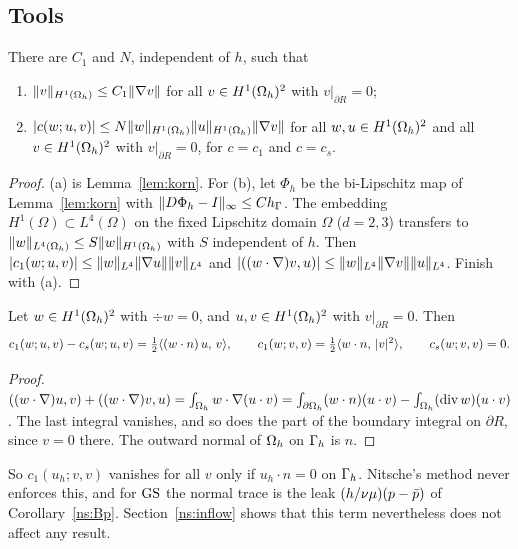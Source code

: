 \subsection{Tools}

\begin{lemma}\label{ns:tri}
There are $C_1$ and $N$, independent of $h$, such that
\begin{enumerate}[label=(\alph*)]
\item $\lVert v\rVert_{H^1(\Omega_h)}\le C_1\lVert \nabla v\rVert$ for all $v\in H^1(\Omega_h)^2$ with $v|_{\partial R}=0$;
\item $|c(w;u,v)|\le N\lVert w\rVert_{H^1(\Omega_h)}\lVert u\rVert_{H^1(\Omega_h)}\lVert \nabla v\rVert$ for all $w,u\in H^1(\Omega_h)^2$ and all $v\in H^1(\Omega_h)^2$ with $v|_{\partial R}=0$, for $c=c_1$ and $c=c_s$.
\end{enumerate}
\end{lemma}

\begin{proof}
(a) is Lemma~\ref{lem:korn}. For (b), let $\Phi_h$ be the bi-Lipschitz map of Lemma~\ref{lem:korn} with $\lVert D\Phi_h-I\rVert_\infty\le Ch_\Gamma$. The embedding $H^1(\Omega)\subset L^4(\Omega)$ on the fixed Lipschitz domain $\Omega$ ($d=2,3$) transfers to $\lVert w\rVert_{L^4(\Omega_h)}\le S\lVert w\rVert_{H^1(\Omega_h)}$ with $S$ independent of $h$. Then $|c_1(w;u,v)|\le\lVert w\rVert_{L^4}\lVert \nabla u\rVert\lVert v\rVert_{L^4}$ and $|((w\cdot\nabla)v,u)|\le\lVert w\rVert_{L^4}\lVert \nabla v\rVert\lVert u\rVert_{L^4}$. Finish with (a).
\end{proof}

\begin{lemma}\label{ns:bdry}
Let $w\in H^1(\Omega_h)^2$ with $\div w=0$, and $u,v\in H^1(\Omega_h)^2$ with $v|_{\partial R}=0$. Then
\[
c_1(w;u,v)-c_s(w;u,v)=\tfrac12\langle (w\cdot n)\,u,\, v\rangle,\qquad c_1(w;v,v)=\tfrac12\langle w\cdot n,\, |v|^2\rangle,\qquad c_s(w;v,v)=0 .
\]
\end{lemma}

\begin{proof}
$((w\cdot\nabla)u,v)+((w\cdot\nabla)v,u)=\int_{\Omega_h}w\cdot\nabla(u\cdot v)=\int_{\partial\Omega_h}(w\cdot n)(u\cdot v)-\int_{\Omega_h}(\operatorname{div} w)(u\cdot v)$. The last integral vanishes, and so does the part of the boundary integral on $\partial R$, since $v=0$ there. The outward normal of $\Omega_h$ on $\Gamma_h$ is $n$.
\end{proof}

So $c_1(u_h;v,v)$ vanishes for all $v$ only if $u_h\cdot n=0$ on $\Gamma_h$. Nitsche's method never enforces this, and for $\mathrm{GS}$ the normal trace is the leak $(h/\nu\mu)(p-\bar p)$ of Corollary~\ref{ns:Bp}. Section~\ref{ns:inflow} shows that this term nevertheless does not affect any result.

